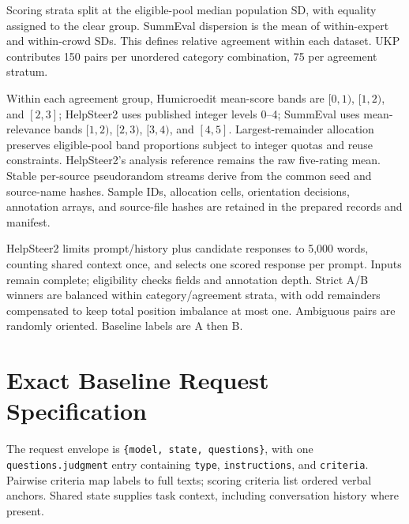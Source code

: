 Scoring strata split at the eligible-pool median population SD, with equality assigned to the clear group. SummEval dispersion is the mean of within-expert and within-crowd SDs. This defines relative agreement within each dataset. UKP contributes 150 pairs per unordered category combination, 75 per agreement stratum.

Within each agreement group, Humicroedit mean-score bands are $[0,1)$, $[1,2)$, and $[2,3]$; HelpSteer2 uses published integer levels 0--4; SummEval uses mean-relevance bands $[1,2)$, $[2,3)$, $[3,4)$, and $[4,5]$. Largest-remainder allocation preserves eligible-pool band proportions subject to integer quotas and reuse constraints. HelpSteer2's analysis reference remains the raw five-rating mean. Stable per-source pseudorandom streams derive from the common seed and source-name hashes. Sample IDs, allocation cells, orientation decisions, annotation arrays, and source-file hashes are retained in the prepared records and manifest.

HelpSteer2 limits prompt/history plus candidate responses to 5,000 words, counting shared context once, and selects one scored response per prompt. Inputs remain complete; eligibility checks fields and annotation depth. Strict A/B winners are balanced within category/agreement strata, with odd remainders compensated to keep total position imbalance at most one. Ambiguous pairs are randomly oriented. Baseline labels are A then B.

\section{Exact Baseline Request Specification}
\label{app:prompts}
The request envelope is \texttt{\{model, state, questions\}}, with one \texttt{questions.judgment} entry containing \texttt{type}, \texttt{instructions}, and \texttt{criteria}. Pairwise criteria map labels to full texts; scoring criteria list ordered verbal anchors. Shared state supplies task context, including conversation history where present.

